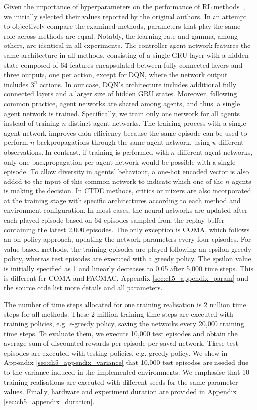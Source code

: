 Given the importance of hyperparameters on the performance of RL methods~\citep{gorsane2022towards}, we initially selected their values reported by the original authors.
In an attempt to objectively compare the examined methods, parameters that play the same role across methods are equal.
Notably, the learning rate and gamma, among others, are identical in all experiments.
The controller agent network features the same architecture in all methods, consisting of a single GRU layer with a hidden state composed of 64 features encapsulated between fully connected layers and three outputs, one per action, except for DQN, where the network output includes $3^n$ actions.
In our case, DQN's architecture includes additional fully connected layers and a larger size of hidden GRU states.
Moreover, following common practice, agent networks are shared among agents, and thus, a single agent network is trained.
Specifically, we train only one network for all agents instead of training $n$ distinct agent networks.
The training process with a single agent network improves data efficiency because the same episode can be used to perform $n$ backpropagations through the same agent network, using $n$ different observations.
In contrast, if training is performed with $n$ different agent networks, only one backpropagation per agent network would be possible with a single episode.
To allow diversity in agents' behaviour, a one-hot encoded vector is also added to the input of this common network to indicate which one of the $n$ agents is making the decision.
In CTDE methods, critics or mixers are also incorporated at the training stage with specific architectures according to each method and environment configuration.
In most cases, the neural networks are updated after each played episode based on 64 episodes sampled from the replay buffer containing the latest 2,000 episodes.
The only exception is COMA, which follows an on-policy approach, updating the network parameters every four episodes.
For value-based methods, the training episodes are played following an epsilon greedy policy, whereas test episodes are executed with a greedy policy.
The epsilon value is initially specified as 1 and linearly decreases to 0.05 after 5,000 time steps.
This is different for COMA and FACMAC. 
Appendix \ref{sec:ch5_appendix_param} and the source code list more details and all parameters.

The number of time steps allocated for one training realisation is 2 million time steps for all methods.
These 2 million training time steps are executed with training policies, e.g. $\epsilon$-greedy policy, saving the networks every 20,000 training time steps.
To evaluate them, we execute 10,000 test episodes and obtain the average sum of discounted rewards per episode per saved network.
These test episodes are executed with testing policies, e.g. greedy policy.
We show in Appendix \ref{sec:ch5_appendix_variance} that 10,000 test episodes are needed due to the variance induced in the implemented environments.
We emphasise that 10 training realisations are executed with different seeds for the same parameter values.
Finally, hardware and experiment duration are provided in Appendix \ref{sec:ch5_appendix_duration}.


